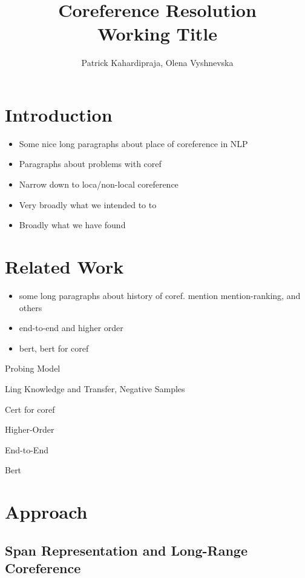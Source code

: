 \documentclass[11pt]{article}
\title{{\LARGE Coreference Resolution}\\[1.5mm]
{\large Working Title}\\[1.5mm]} %
\author{Patrick Kahardipraja, Olena Vyshnevska}%
\date{} %
\begin{document}
\maketitle


\section{Introduction}

\begin{itemize}
 \item{Some nice long paragraphs about place of coreference in NLP  }
\item{Paragraphs about problems with coref   }
 \item{Narrow down to loca/non-local coreference }  
 \item{Very broadly what we intended to to}   
 \item{Broadly what we have found   }
\end{itemize}


\section{Related Work} 

\begin{itemize}
\item{some long paragraphs about history of coref. mention mention-ranking, and others}
\item{end-to-end and higher order}
\item{bert, bert for coref} 
\end{itemize}

\textcite{tenney2019context} Probing Model

\textcite{liu2019linguistic}  Ling Knowledge and Transfer, Negative Samples

\textcite{joshi2019coref} Cert for coref

\textcite{lee2018higher} Higher-Order

\textcite{lee2017end} End-to-End

\textcite{devlin2019bert} Bert

\section{Approach}


\subsection{Span Representation and Long-Range Coreference}
\end{document}
